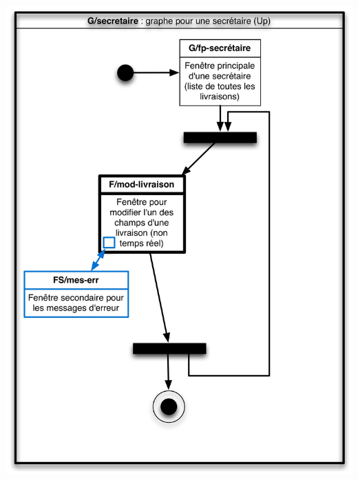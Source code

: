 \documentclass{report}
\begin{document}
\paragraph{}
~~\\
\begin{center}
\includegraphics[scale = 0.25]{images/g-secretaire.jpg}
\end{center}
\end{document}

